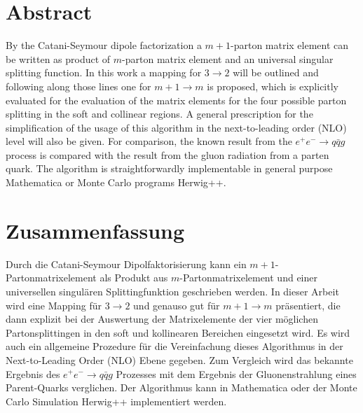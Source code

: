 \section*{\Large \bfseries \centering Abstract}
\vspace{1cm}

By the Catani-Seymour dipole factorization a $m+1$-parton matrix element can be written as product of $m$-parton matrix element and an universal singular splitting function.  
In this work a mapping for $ 3\rightarrow 2 $ will be outlined and following along those lines one for $ m+1\rightarrow m $ is proposed, which is explicitly evaluated for the evaluation of the matrix elements for the four possible parton splitting in the soft and collinear regions. A general prescription for the simplification of the usage of this algorithm in the next-to-leading order (NLO) level will also be given.  For comparison, the known result from the $ e^{+}e^{-} \rightarrow q \bar{q} g $ process is compared with the result from the gluon radiation from a parten quark. 
The algorithm is straightforwardly implementable in general purpose \textup{Mathematica} or Monte Carlo programs \textup{Herwig++}.

\vspace{3cm}
\section*{\Large \bfseries \centering Zusammenfassung}
\vspace{1cm}

Durch die Catani-Seymour Dipolfaktorisierung kann ein $m+1$-Partonmatrixelement als Produkt aus $m$-Partonmatrixelement und einer universellen singul\"aren Splittingfunktion geschrieben werden.  
In dieser Arbeit wird eine Mapping für $ 3\rightarrow 2 $ und genauso gut f\"ur $ m+1\rightarrow m $ pr\"asentiert, die dann explizit bei der Auswertung der Matrixelemente der vier möglichen Partonsplittingen in den soft und kollinearen Bereichen eingesetzt wird. Es wird auch ein allgemeine Prozedure für die Vereinfachung dieses Algorithmus in der Next-to-Leading Order (NLO) Ebene gegeben.  Zum Vergleich wird das bekannte Ergebnis des $ e^{+}e^{-} \rightarrow q \bar{q} g $ Prozesses mit dem Ergebnis der Gluonenstrahlung eines Parent-Quarks verglichen. 
Der Algorithmus kann in \textup{Mathematica} oder der Monte Carlo Simulation \textup{Herwig++} implementiert werden.